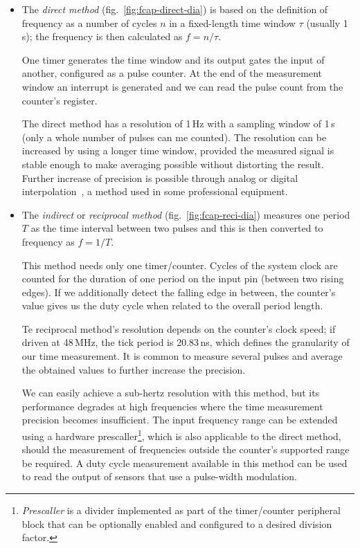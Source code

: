 \begin{itemize}
	\item The \textit{direct method} (fig.~\ref{fig:fcap-direct-dia}) is based on the definition of frequency as a number of cycles $n$ in a fixed-length time window $\tau$ (usually 1\,s); the frequency is then calculated as $f=n/\tau$.

	One timer generates the time window and its output gates the input of another, configured as a pulse counter. At the end of the measurement window an interrupt is generated and we can read the pulse count from the counter's register.

	The direct method has a resolution of 1\,Hz with a sampling window of 1\,s (only a whole number of pulses can me counted). The resolution can be increased by using a longer time window, provided the measured signal is stable enough to make averaging possible without distorting the result. Further increase of precision is possible through analog or digital interpolation~\cite{fcap-increasing}, a method used in some professional equipment.

	\item The \textit{indirect} or \textit{reciprocal method} (fig.~\ref{fig:fcap-reci-dia}) measures one period $T$ as the time interval between two pulses and this is then converted to frequency as $f=1/T$.

	This method needs only one timer/counter. Cycles of the system clock are counted for the duration of one period on the input pin (between two rising edges). If we additionally detect the falling edge in between, the counter's value gives us the duty cycle when related to the overall period length.

	Te reciprocal method's resolution depends on the counter's clock speed; if driven at 48\,MHz, the tick period is 20.83\,ns, which defines the granularity of our time measurement. It is common to measure several pulses and average the obtained values to further increase the precision.

	We can easily achieve a sub-hertz resolution with this method, but its performance degrades at high frequencies where the time measurement precision becomes insufficient. The input frequency range can be extended using a hardware prescaller\footnote{\textit{Prescaller} is a divider implemented as part of the timer/counter peripheral block that can be optionally enabled and configured to a desired division factor.}, which is also applicable to the direct method, should the measurement of frequencies outside the counter's supported range be required. A duty cycle measurement available in this method can be used to read the output of sensors that use a pulse-width modulation.

\end{itemize}

